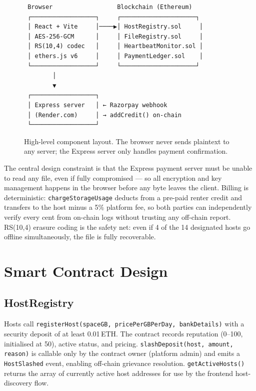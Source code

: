 \documentclass[journal]{IEEEtran}
\begin{document}
\begin{figure}[t]
\centering
\begin{verbatim}
 Browser                  Blockchain (Ethereum)
 ┌──────────────────┐     ┌─────────────────────┐
 │ React + Vite     │────▶│ HostRegistry.sol     │
 │ AES-256-GCM      │     │ FileRegistry.sol     │
 │ RS(10,4) codec   │     │ HeartbeatMonitor.sol │
 │ ethers.js v6     │     │ PaymentLedger.sol    │
 └──────────────────┘     └─────────────────────┘
        │
        ▼
 ┌──────────────────┐
 │ Express server   │ ← Razorpay webhook
 │ (Render.com)     │ → addCredit() on-chain
 └──────────────────┘
\end{verbatim}
\caption{High-level component layout. The browser never sends plaintext to
any server; the Express server only handles payment confirmation.}
\label{fig:arch}
\end{figure}

The central design constraint is that the Express payment server must be
unable to read any file, even if fully compromised — so all encryption and
key management happens in the browser before any byte leaves the client.
Billing is deterministic: \texttt{chargeStorageUsage} deducts from a pre-paid
renter credit and transfers to the host minus a 5\% platform fee, so both
parties can independently verify every cent from on-chain logs without
trusting any off-chain report.
RS(10,4) erasure coding is the safety net: even if 4 of the 14 designated
hosts go offline simultaneously, the file is fully recoverable.

\section{Smart Contract Design}
\label{sec:contracts}

\subsection{HostRegistry}
Hosts call \texttt{registerHost(spaceGB, pricePerGBPerDay, bankDetails)}
with a security deposit of at least 0.01\,ETH. The contract records
reputation (0–100, initialised at 50), active status, and pricing.
%
\texttt{slashDeposit(host, amount, reason)} is callable only by the
contract owner (platform admin) and emits a \texttt{HostSlashed} event,
enabling off-chain grievance resolution.
%
\texttt{getActiveHosts()} returns the array of currently active host
addresses for use by the frontend host-discovery flow.
\end{document}
